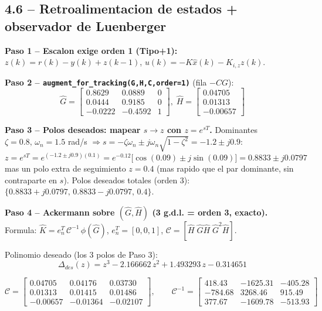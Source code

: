 \documentclass[11pt]{article}
\begin{document}
\subsection{4.6 -- Retroalimentacion de estados + observador de Luenberger}

\textbf{Paso 1 -- Escalon exige orden 1 (Tipo+1):}
$z(k)=r(k)-y(k)+z(k-1)$, $u(k)=-K\hat x(k)-K_{i,z}z(k)$.

\textbf{Paso 2 -- \texttt{augment\_for\_tracking(G,H,C,order=1)}} (fila $-CG$):
\begin{equation}
\hat G=\begin{bmatrix}0.8629&0.0889&0\\0.0444&0.9185&0\\-0.0222&-0.4592&1\end{bmatrix},\;
\hat H=\begin{bmatrix}0.04705\\0.01313\\-0.00657\end{bmatrix}
\end{equation}

\textbf{Paso 3 -- Polos deseados: mapear $s\to z$ con $z=e^{sT}$.}
Dominantes $\zeta=0.8,\,\omega_n=1.5$ rad/s $\Rightarrow s=-\zeta\omega_n\pm j\omega_n\sqrt{1-\zeta^2}=-1.2\pm j0.9$:
\begin{equation}
z=e^{sT}=e^{(-1.2\pm j0.9)(0.1)}=e^{-0.12}\big[\cos(0.09)\pm j\sin(0.09)\big]=0.8833\pm j0.0797
\end{equation}
mas un polo extra de seguimiento $z=0.4$ (mas rapido que el par dominante, sin
contraparte en $s$). Polos deseados totales (orden 3): $\{0.8833{+}j0.0797,\,0.8833{-}j0.0797,\,0.4\}$.

\textbf{Paso 4 -- Ackermann sobre $(\hat G,\hat H)$ (3 g.d.l. = orden 3, exacto).}
Formula: $\hat K=e_n^T\,\mathcal C^{-1}\,\phi(\hat G)$, $e_n^T=[0,0,1]$,
$\mathcal C=[\hat H\;\hat G\hat H\;\hat G^2\hat H]$.

Polinomio deseado (los 3 polos de Paso 3):
\begin{equation}
\Delta_{des}(z)=z^3-2.166662\,z^2+1.493293\,z-0.314651
\end{equation}

\begin{equation}
\mathcal C=\begin{bmatrix}0.04705&0.04176&0.03730\\0.01313&0.01415&0.01486\\
-0.00657&-0.01364&-0.02107\end{bmatrix},\qquad
\mathcal C^{-1}=\begin{bmatrix}418.43&-1625.31&-405.28\\-784.68&3268.46&915.49\\377.67&-1609.78&-513.93\end{bmatrix}
\end{equation}
\end{document}
